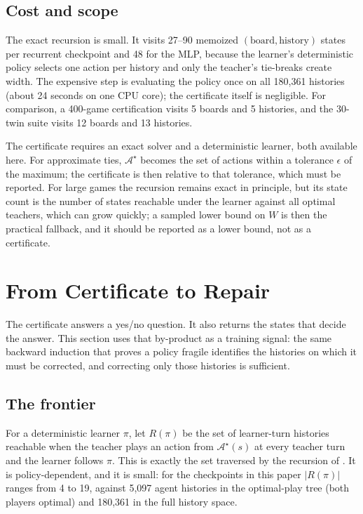 \documentclass[conference]{IEEEtran}
\begin{document}
\subsection{Cost and scope}
The exact recursion is small. It visits 27--90 memoized $(\text{board},\text{history})$ states per recurrent checkpoint and 48 for the MLP, because the learner's deterministic policy selects one action per history and only the teacher's tie-breaks create width. The expensive step is evaluating the policy once on all 180{,}361 histories (about 24 seconds on one CPU core); the certificate itself is negligible. For comparison, a 400-game certification visits 5 boards and 5 histories, and the 30-twin suite visits 12 boards and 13 histories.

The certificate requires an exact solver and a deterministic learner, both available here. For approximate ties, $\mathcal{A}^{\star}$ becomes the set of actions within a tolerance $\epsilon$ of the maximum; the certificate is then relative to that tolerance, which must be reported. For large games the recursion remains exact in principle, but its state count is the number of states reachable under the learner against all optimal teachers, which can grow quickly; a sampled lower bound on $W$ is then the practical fallback, and it should be reported as a lower bound, not as a certificate.

\section{From Certificate to Repair}
\label{sec:repair}

The certificate answers a yes/no question. It also returns the states that decide the answer. This section uses that by-product as a training signal: the same backward induction that proves a policy fragile identifies the histories on which it must be corrected, and correcting only those histories is sufficient.

\subsection{The frontier}
For a deterministic learner $\pi$, let $R(\pi)$ be the set of learner-turn histories reachable when the teacher plays an action from $\mathcal{A}^{\star}(s)$ at every teacher turn and the learner follows $\pi$. This is exactly the set traversed by the recursion of . It is policy-dependent, and it is small: for the checkpoints in this paper $|R(\pi)|$ ranges from 4 to 19, against 5{,}097 agent histories in the optimal-play tree (both players optimal) and 180{,}361 in the full history space.
\end{document}
